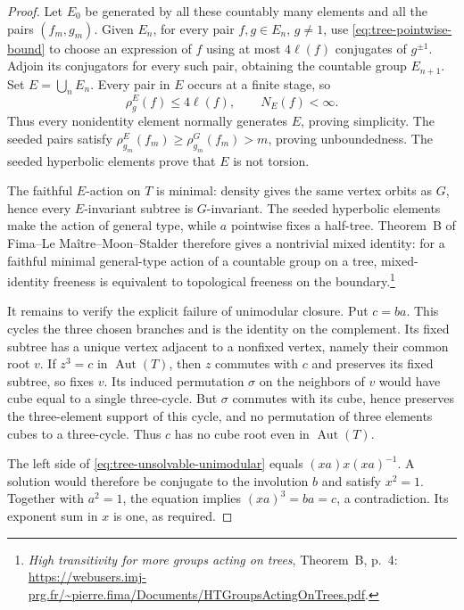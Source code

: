 \begin{proof}
Let $E_0$ be generated by all these countably many elements and all
the pairs $(f_m,g_m)$.  Given $E_n$, for every pair $f,g\in E_n$,
$g\ne1$, use \eqref{eq:tree-pointwise-bound} to choose an expression
of $f$ using at most $4\ell(f)$ conjugates of $g^{\pm1}$.  Adjoin
its conjugators for every such pair, obtaining the countable group
$E_{n+1}$.  Set $E=\bigcup_nE_n$.  Every pair in $E$ occurs at a
finite stage, so
\[
 \rho_g^E(f)\leq4\ell(f),\qquad N_E(f)<\infty.
\]
Thus every nonidentity element normally generates $E$, proving
simplicity.  The seeded pairs satisfy
$\rho_{g_m}^E(f_m)\geq\rho_{g_m}^G(f_m)>m$, proving unboundedness.
The seeded hyperbolic elements prove that $E$ is not torsion.

The faithful $E$-action on $T$ is minimal: density gives the same
vertex orbits as $G$, hence every $E$-invariant subtree is
$G$-invariant.  The seeded hyperbolic elements make the action of
general type, while $a$ pointwise fixes a half-tree.  Theorem~B of
Fima--Le Ma\^itre--Moon--Stalder therefore gives a nontrivial mixed
identity: for a faithful minimal general-type action of a countable
group on a tree, mixed-identity freeness is equivalent to topological
freeness on the boundary.\footnote{\emph{High transitivity for more
groups acting on trees}, Theorem~B, p.~4:
\url{https://webusers.imj-prg.fr/~pierre.fima/Documents/HTGroupsActingOnTrees.pdf}.}

It remains to verify the explicit failure of unimodular closure.
Put $c=ba$.  This cycles the three chosen branches and is the identity
on the complement.  Its fixed subtree has a unique vertex adjacent
to a nonfixed vertex, namely their common root $v$.  If $z^3=c$ in
$\operatorname{Aut}(T)$, then $z$ commutes with $c$ and preserves its
fixed subtree, so fixes $v$.  Its induced permutation $\sigma$ on
the neighbors of $v$ would have cube equal to a single three-cycle.
But $\sigma$ commutes with its cube, hence preserves the
three-element support of this cycle, and no permutation of three
elements cubes to a three-cycle.  Thus $c$ has no cube root even in
$\operatorname{Aut}(T)$.

The left side of \eqref{eq:tree-unsolvable-unimodular} equals
$(xa)x(xa)^{-1}$.  A solution would therefore be conjugate to the
involution $b$ and satisfy $x^2=1$.  Together with $a^2=1$, the
equation implies $(xa)^3=ba=c$, a contradiction.  Its exponent sum
in $x$ is one, as required.
\end{proof}

